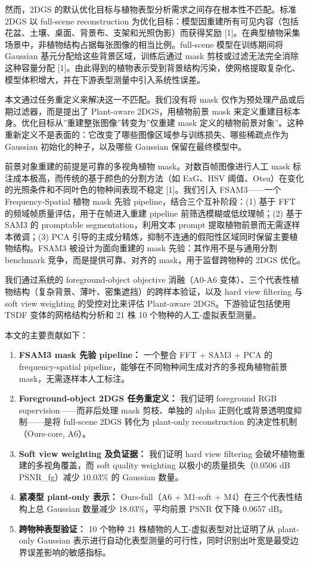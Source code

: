 \documentclass[11pt,a4paper]{article}
\begin{document}
然而，2DGS 的默认优化目标与植物表型分析需求之间存在根本性不匹配。标准
2DGS 以 full-scene reconstruction
为优化目标：模型因重建所有可见内容（包括花盆、土壤、桌面、背景布、支架和光照伪影）而获得奖励
{[}1{]}。在典型植物采集场景中，非植物结构占据每张图像的相当比例。full-scene
模型在训练期间将 Gaussian 基元分配给这些背景区域，训练后通过 mask
剪枝或过滤无法完全消除这种容量分配
{[}1{]}。由此得到的植物表示受到背景结构污染，使网格提取复杂化、模型体积增大，并在下游表型测量中引入系统性误差。

本文通过任务重定义来解决这一不匹配。我们没有将 mask
仅作为预处理产品或后期过滤器，而是提出了 Plant-aware 2DGS，用植物前景
mask 来定义重建目标本身。优化目标从''重建整张图像''转变为''仅重建 mask
定义的植物前景对象''。这种重新定义不是表面的：它改变了哪些图像区域参与训练损失、哪些稀疏点作为
Gaussian 初始化的种子，以及哪些 Gaussian 保留在最终模型中。

前景对象重建的前提是可靠的多视角植物 mask。对数百帧图像进行人工 mask
标注成本极高，而传统的基于颜色的分割方法（如 ExG、HSV
阈值、Otsu）在变化的光照条件和不同叶色的物种间表现不稳定
{[}1{]}。我们引入 FSAM3------一个 Frequency-Spatial 植物 mask 先验
pipeline，结合三个互补阶段：(1) 基于 FFT
的频域帧质量评估，用于在帧进入重建 pipeline 前筛选模糊或低纹理帧；(2)
基于 SAM3 的 promptable segmentation，利用文本 prompt
提取植物前景而无需逐样本微调；(3) PCA
引导的主成分精炼，抑制不连通的假阳性区域同时保留主要植物结构。FSAM3
被设计为面向重建的 mask 先验：其作用不是与通用分割 benchmark
竞争，而是提供可靠、对齐的 mask，用于监督跨物种的 2DGS 优化。

我们通过系统的 foreground-object objective 消融（A0-A6
变体）、三个代表性植物结构（复杂背景、薄叶、密集遮挡）的跨样本验证，以及
hard view filtering 与 soft view weighting 的受控对比来评估 Plant-aware
2DGS。下游验证包括使用 TSDF 变体的网格结构分析和 21 株 10
个物种的人工-虚拟表型测量。

本文的主要贡献如下：

\begin{enumerate}
\def\labelenumi{\arabic{enumi}.}
\item
  \textbf{FSAM3 mask 先验 pipeline：} 一个整合 FFT + SAM3 + PCA 的
  frequency-spatial pipeline，能够在不同物种间生成对齐的多视角植物前景
  mask，无需逐样本人工标注。
\item
  \textbf{Foreground-object 2DGS 任务重定义：} 我们证明 foreground RGB
  supervision------而非后处理 mask 剪枝、单独的 alpha
  正则化或背景透明度抑制------是将 full-scene 2DGS 转化为 plant-only
  reconstruction 的决定性机制（Ours-core, A6）。
\item
  \textbf{Soft view weighting 及负证据：} 我们证明 hard view filtering
  会破坏植物重建的多视角覆盖，而 soft quality weighting
  以极小的质量损失（0.0506 dB PSNR\_fg）减少 10.03\% 的 Gaussian 数量。
\item
  \textbf{紧凑型 plant-only 表示：} Ours-full（A6 + M1-soft +
  M4）在三个代表性结构上总 Gaussian 数量减少 18.03\%，平均前景 PSNR
  仅下降 0.0657 dB。
\item
  \textbf{跨物种表型验证：} 10 个物种 21
  株植物的人工-虚拟表型对比证明了从 plant-only Gaussian
  表示进行自动化表型测量的可行性，同时识别出叶宽是最受边界误差影响的敏感指标。
\end{enumerate}
\end{document}
